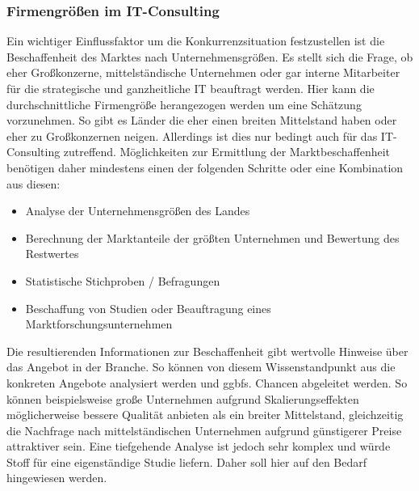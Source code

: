  \subsubsection{Firmengrößen im IT-Consulting}
Ein wichtiger Einflussfaktor um die Konkurrenzsituation festzustellen ist die Beschaffenheit des Marktes nach Unternehmensgrößen.
 Es stellt sich die Frage, ob eher Großkonzerne, mittelständische Unternehmen oder gar interne Mitarbeiter für die strategische und ganzheitliche IT beauftragt werden.
 Hier kann die durchschnittliche Firmengröße herangezogen werden um eine Schätzung vorzunehmen. So gibt es Länder die eher einen breiten Mittelstand haben oder eher zu Großkonzernen neigen. 
 Allerdings ist dies nur bedingt auch für das IT-Consulting zutreffend. 
Möglichkeiten zur Ermittlung der Marktbeschaffenheit benötigen daher mindestens einen der folgenden Schritte oder eine Kombination aus diesen:
\begin{itemize}
\item Analyse der Unternehmensgrößen des Landes
\item Berechnung der Marktanteile der größten Unternehmen und Bewertung des Restwertes
\item Statistische Stichproben / Befragungen
\item Beschaffung von Studien oder Beauftragung eines Marktforschungsunternehmen
\end{itemize}
Die resultierenden Informationen zur Beschaffenheit gibt wertvolle Hinweise über das Angebot in der Branche. 
So können von diesem Wissenstandpunkt aus die konkreten Angebote analysiert werden und ggbfs. Chancen abgeleitet werden. 
So können beispielsweise große Unternehmen aufgrund Skalierungseffekten möglicherweise bessere Qualität anbieten als ein breiter Mittelstand, gleichzeitig die Nachfrage nach mittelständischen Unternehmen aufgrund günstigerer Preise attraktiver sein. 
Eine tiefgehende Analyse ist jedoch sehr komplex und würde Stoff für eine eigenständige Studie liefern. Daher soll hier auf den Bedarf hingewiesen werden.



